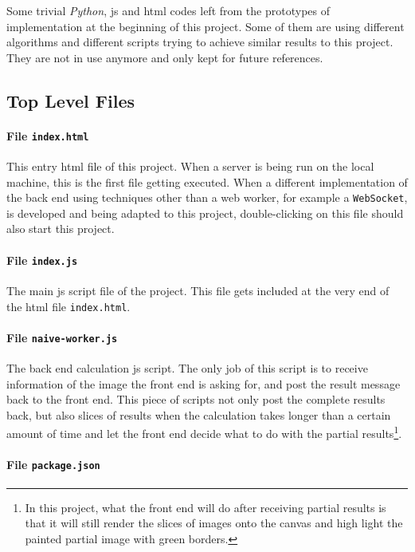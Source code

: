 Some trivial \emph{Python}, \gls{js} and \gls{html} codes left from the prototypes of implementation at the beginning of this project. Some of them are using different algorithms and different scripts trying to achieve similar results to this project. They are not in use anymore and only kept for future references.

\subsection{Top Level Files}

\paragraph{File \texttt{index.html}}

This entry \gls{html} file of this project. When a server is being run on the local machine, this is the first file getting executed. When a different implementation of the back end using techniques other than a web worker, for example a \texttt{WebSocket}, is developed and being adapted to this project, double-clicking on this file should also start this project.

\paragraph{File \texttt{index.js}}

The main \gls{js} script file of the project. This file gets included at the very end of the \gls{html} file \texttt{index.html}.

\paragraph{File \texttt{naive-worker.js}}

The back end calculation \gls{js} script. The only job of this script is to receive information of the image the front end is asking for, and post the result message back to the front end. This piece of scripts not only post the complete results back, but also slices of results when the calculation takes longer than a certain amount of time and let the front end decide what to do with the partial results\footnote{ In this project, what the front end will do after receiving partial results is that it will still render the slices of images onto the canvas and high light the painted partial image with green borders. }.

\paragraph{File \texttt{package.json}}

